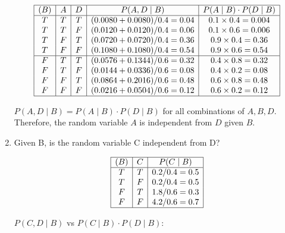 \documentclass[12pt]{article}
\begin{document}
\begin{enumerate}[font=\Large,label=(\alph*)]
	      $$
		      \begin{array}{|c|c|c|c|c|}
			      \hline
			      (B) & A & D & P(A, D \mid B)               & P(A \mid B) \cdot P(D \mid B) \\
			      \hline
			      T   & T & T & (0.0080 + 0.0080)/0.4 = 0.04 & 0.1 \times 0.4 = 0.004        \\
			      T   & T & F & (0.0120 + 0.0120)/0.4 = 0.06 & 0.1 \times 0.6 = 0.006        \\
			      T   & F & T & (0.0720 + 0.0720)/0.4 = 0.36 & 0.9 \times 0.4 = 0.36         \\
			      T   & F & F & (0.1080 + 0.1080)/0.4 = 0.54 & 0.9 \times 0.6 = 0.54         \\
			      \hline
			      F   & T & T & (0.0576 + 0.1344)/0.6 = 0.32 & 0.4 \times 0.8 = 0.32         \\
			      F   & T & F & (0.0144 + 0.0336)/0.6 = 0.08 & 0.4 \times 0.2 = 0.08         \\
			      F   & F & T & (0.0864 + 0.2016)/0.6 = 0.48 & 0.6 \times 0.8 = 0.48         \\
			      F   & F & F & (0.0216 + 0.0504)/0.6 = 0.12 & 0.6 \times 0.2 = 0.12         \\
			      \hline
		      \end{array}
	      $$

	      $P(A, D \mid B) = P(A \mid B) \cdot P(D \mid B)$ for all combinations of $A,B,D$. Therefore, the random variable $A$ is independent from $D$ given $B$.

	\item Given B, is the random variable C independent from D?

	      $$
		      \begin{array}{|c|c|c|}
			      \hline
			      (B) & C & P(C \mid B) \\
			      \hline
			      T   & T & 0.2/0.4=0.5 \\
			      T   & F & 0.2/0.4=0.5 \\
			      F   & T & 1.8/0.6=0.3 \\
			      F   & F & 4.2/0.6=0.7 \\
			      \hline
		      \end{array}
	      $$

	      $P(C, D \mid B)$ vs $P(C \mid B) \cdot P(D \mid B):$


\end{enumerate}
\end{document}
